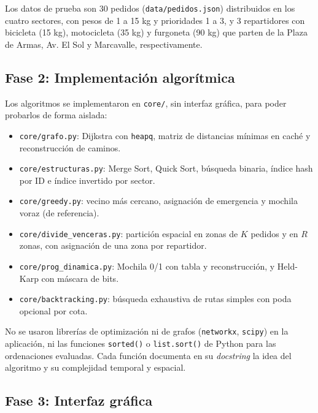 Los datos de prueba son 30 pedidos (\texttt{data/pedidos.json}) distribuidos en los cuatro sectores, con pesos de 1 a 15 kg y prioridades 1 a 3, y 3 repartidores con bicicleta (15 kg), motocicleta (35 kg) y furgoneta (90 kg) que parten de la Plaza de Armas, Av. El Sol y Marcavalle, respectivamente.

\subsection{Fase 2: Implementación algorítmica}

Los algoritmos se implementaron en \texttt{core/}, sin interfaz gráfica, para poder probarlos de forma aislada:
\begin{itemize}
    \item \texttt{core/grafo.py}: Dijkstra con \texttt{heapq}, matriz de distancias mínimas en caché y reconstrucción de caminos.
    \item \texttt{core/estructuras.py}: Merge Sort, Quick Sort, búsqueda binaria, índice hash por ID e índice invertido por sector.
    \item \texttt{core/greedy.py}: vecino más cercano, asignación de emergencia y mochila voraz (de referencia).
    \item \texttt{core/divide\_venceras.py}: partición espacial en zonas de $K$ pedidos y en $R$ zonas, con asignación de una zona por repartidor.
    \item \texttt{core/prog\_dinamica.py}: Mochila 0/1 con tabla y reconstrucción, y Held-Karp con máscara de bits.
    \item \texttt{core/backtracking.py}: búsqueda exhaustiva de rutas simples con poda opcional por cota.
\end{itemize}
No se usaron librerías de optimización ni de grafos (\texttt{networkx}, \texttt{scipy}) en la aplicación, ni las funciones \texttt{sorted()} o \texttt{list.sort()} de Python para las ordenaciones evaluadas. Cada función documenta en su \textit{docstring} la idea del algoritmo y su complejidad temporal y espacial.

\subsection{Fase 3: Interfaz gráfica}

